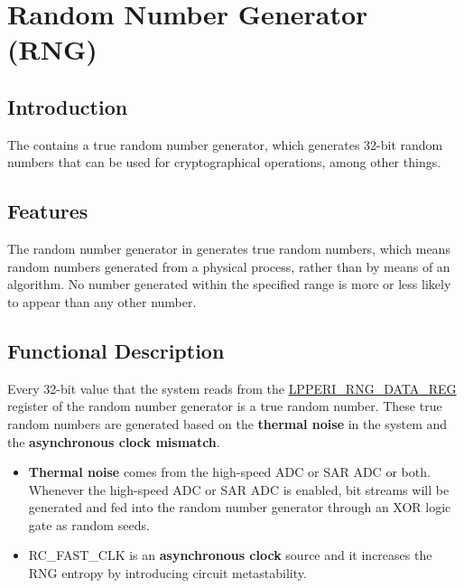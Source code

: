 \documentclass[main\_\_EN.tex]{subfiles}
\begin{document}

\ifglobal
\else
    {\let\clearpage\relax \listoftodos}
    {\let\clearpage\relax \listofdonetodos}
    \tableofcontents
\fi



\hypertarget{rng}{}
\chapter{Random Number Generator (RNG)}\label{mod:rng}

\section{Introduction}

The \chipname{} contains a true random number generator, which generates 32-bit random numbers that can be used for cryptographical operations, among other things.

\section{Features}

The random number generator in \chipname{} generates true random numbers, which means random numbers generated from a physical process, rather than by means of an algorithm. No number generated within the specified range is more or less likely to appear than any other number.

\section{Functional Description}\label{sec:rng-func-descr}

Every 32-bit value that the system reads from the \hyperref[regdesc:LPPERIRNGDATAREG]{LPPERI\_RNG\_DATA\_REG} register of the random number generator is a true random number. These true random numbers are generated based on the \textbf{thermal noise} in the system and the \textbf{asynchronous clock mismatch}.

\begin{itemize}
    \item \textbf{Thermal noise} comes from the high-speed ADC or SAR ADC or both. Whenever the high-speed ADC or SAR ADC is enabled, bit streams will be generated and fed into the random number generator through an XOR logic gate as random seeds.
    \item RC\_FAST\_CLK is an \textbf{asynchronous clock} source and it increases the RNG entropy by introducing circuit metastability.
\end{itemize}
\end{document}
